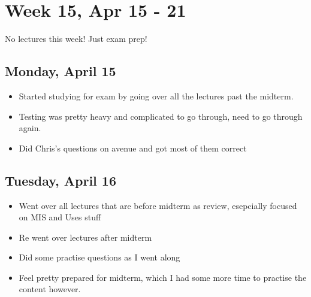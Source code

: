 \documentclass{article}
\begin{document}
\section{Week 15, Apr 15 - 21}

No lectures this week! Just exam prep!

\subsection{Monday, April 15}
\begin{itemize}
    \item Started studying for exam by going over all the lectures past the midterm.
    \item Testing was pretty heavy and complicated to go through, need to go through again.
    \item Did Chris's questions on avenue and got most of them correct
\end{itemize}

\subsection{Tuesday, April 16}
\begin{itemize}
    \item Went over all lectures that are before midterm as review, esepcially focused on MIS and Uses stuff
    \item Re went over lectures after midterm
    \item Did some practise questions as I went along
    \item Feel pretty prepared for midterm, which I had some more time to practise the content however.
\end{itemize}
\end{document}
